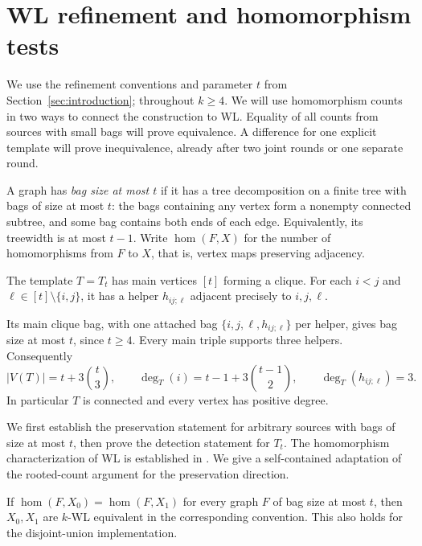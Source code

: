 \section{WL refinement and homomorphism tests}\label{sec:wl-tests}

We use the refinement conventions and parameter \(t\) from
Section~\ref{sec:introduction}; throughout \(k\ge4\).
We will use homomorphism counts in two ways to connect the construction to WL.
Equality of all counts from sources with small bags will prove
equivalence. A difference for one explicit template will prove
inequivalence, already after two joint rounds or one separate round.

A graph has \emph{bag size at most \(t\)} if it has a tree decomposition
on a finite tree with bags of size at most \(t\): the bags containing any vertex form a
nonempty connected subtree, and some bag contains both ends of each
edge. Equivalently, its treewidth is at most \(t-1\).
Write \(\hom(F,X)\) for the number of homomorphisms from \(F\) to \(X\),
that is, vertex maps preserving adjacency.

\begin{definition}\label{def:template}
The template \(T=T_t\) has main vertices \([t]\) forming a clique.
For each \(i<j\) and \(\ell\in[t]\setminus\{i,j\}\), it has a helper
\(h_{ij;\ell}\) adjacent precisely to \(i,j,\ell\).
\end{definition}
Its main clique bag, with one attached bag
\(\{i,j,\ell,h_{ij;\ell}\}\) per helper, gives bag size at most \(t\),
since \(t\ge4\).
Every main triple supports three helpers. Consequently
\begin{equation}\label{eq:template-size}
 |V(T)|=t+3\binom t3,\qquad
 \deg_T(i)=t-1+3\binom{t-1}{2},\qquad
 \deg_T(h_{ij;\ell})=3.
\end{equation}
In particular \(T\) is connected and every vertex has positive degree.

We first establish the preservation statement for arbitrary sources
with bags of size at most \(t\), then prove the detection statement
for \(T_t\).
The homomorphism characterization of WL is established in
\citet{Dvorak2010,DGR2018}. We give a self-contained adaptation of the
rooted-count argument for the preservation direction.

\begin{lemma}\label{lem:hom-implies-wl}
If \(\hom(F,X_0)=\hom(F,X_1)\) for every graph \(F\) of bag size at most
\(t\), then \(X_0,X_1\) are \(k\)-WL equivalent in the corresponding
convention. This also holds for the disjoint-union implementation.
\end{lemma}

